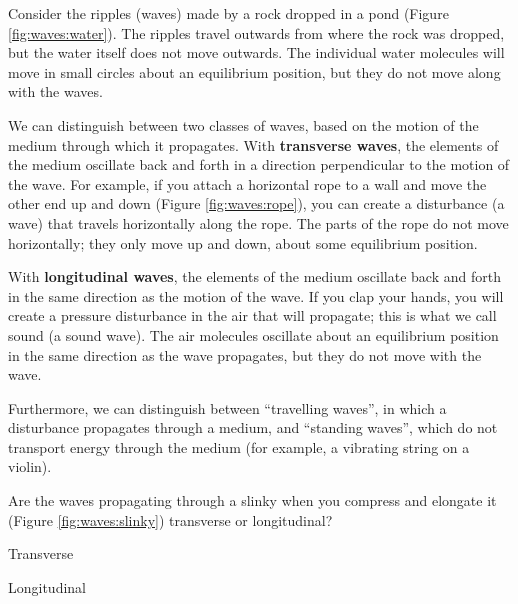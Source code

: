 Consider the ripples (waves) made by a rock dropped in a pond (Figure \ref{fig:waves:water}). The ripples travel outwards from where the rock was dropped, but the water itself does not move outwards. The individual water molecules will move in small circles about an equilibrium position, but they do not move along with the waves.

We can distinguish between two classes of waves, based on the motion of the medium through which it propagates. With \textbf{transverse waves}, the elements of the medium oscillate back and forth in a direction perpendicular to the motion of the wave. For example, if you attach a horizontal rope to a wall and move the other end up and down (Figure \ref{fig:waves:rope}), you can create a disturbance (a wave) that travels horizontally along the rope. The parts of the rope do not move horizontally; they only move up and down, about some equilibrium position. 

With \textbf{longitudinal waves}, the elements of the medium oscillate back and forth in the same direction as the motion of the wave. If you clap your hands, you will create a pressure disturbance in the air that will propagate; this is what we call sound (a sound wave). The air molecules oscillate about an equilibrium position in the same direction as the wave propagates, but they do not move with the wave.

 Furthermore, we can distinguish between ``travelling waves'', in which a disturbance propagates through a medium, and ``standing waves'', which do not transport energy through the medium (for example, a vibrating string on a violin). 

\begin{checkpoint}
\begin{MCquestion}{Are the waves propagating through a slinky when you compress and elongate it (Figure \ref{fig:waves:slinky}) transverse or longitudinal?
}
\item Transverse
\item Longitudinal\correct
\end{MCquestion}
\end{checkpoint}



